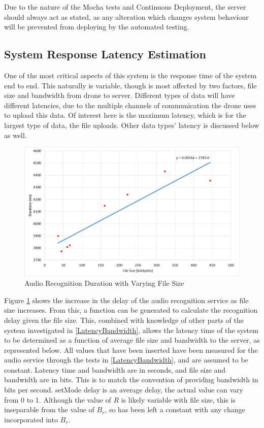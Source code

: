 \documentclass{article}
\begin{document}
Due to the nature of the Mocha tests and Continuous Deployment, the server should always act as stated, as any alteration which changes system behaviour will be prevented from deploying by the automated testing.



\subsection{System Response Latency Estimation}
One of the most critical aspects of this system is the response time of the system end to end. This naturally is variable, though is most affected by two factors, file size and bandwidth from drone to server. Different types of data will have different latencies, due to the multiple channels of communication the drone uses to upload this data. Of interest here is the maximum latency, which is for the largest type of data, the file uploads. Other data types' latency is discussed below as well.

\begin{figure}[h]
\caption{Audio Recognition Duration with Varying File Size\label{fig:RecognitionDuration}}
\includegraphics[width=\textwidth]{RecognitionDuration}
\end{figure}

Figure \ref{fig:RecognitionDuration} shows the increase in the delay of the audio recognition service as file size increases. From this, a function can be generated to calculate the recognition delay given the file size. This, combined with knowledge of other parts of the system investigated in \ref{LatencyBandwidth}, allows the latency time of the system to be determined as a function of average file size and bandwidth to the server, as represented below. All values that have been inserted have been measured for the audio service through the tests in \ref{LatencyBandwidth}, and are assumed to be constant. Latency time and bandwidth are in seconds, and file size and bandwidth are in bits. This is to match the convention of providing bandwidth in bits per second. setMode delay is an average delay, the actual value can vary from 0 to 1. Although the value of $R$ is likely variable with file size, this is inseparable from the value of $B_r$, so has been left a constant with any change incorporated into $B_r$.
\end{document}
